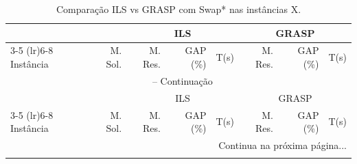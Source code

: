 \begin{longtable}{@{}lrrrrrrr@{}}
\caption{Comparação ILS vs GRASP com Swap* nas instâncias X.} \label{tab:ils_grasp_swap_comparison} \\
\toprule
& & \multicolumn{3}{c}{ILS} & \multicolumn{3}{c}{GRASP} \\
\cmidrule(lr){3-5} \cmidrule(lr){6-8}
Instância & M. Sol. & M. Res. & GAP (\%) & T(s) & M. Res. & GAP (\%) & T(s) \\
\midrule
\endfirsthead

\multicolumn{8}{c}{{\tablename\ \thetable{} -- Continuação}} \\
\toprule
& & \multicolumn{3}{c}{ILS} & \multicolumn{3}{c}{GRASP} \\
\cmidrule(lr){3-5} \cmidrule(lr){6-8}
Instância & M. Sol. & M. Res. & GAP (\%) & T(s) & M. Res. & GAP (\%) & T(s) \\
\midrule
\endhead

\midrule
\multicolumn{8}{r}{{Continua na próxima página...}} \\
\endfoot

\bottomrule
\endlastfoot


\end{longtable}
